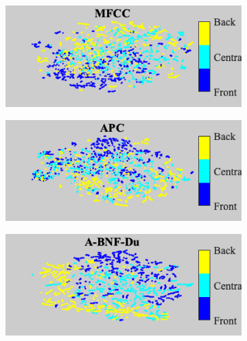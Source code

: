 \documentclass[transmag]{IEEEtran}
\begin{document}
\begin{figure}[!t]
    \begin{subfigure}{0.495\linewidth}
	   \centering
	   \includegraphics[width=1\linewidth]{Rtsne_af_backness_mfcc_disc_bar_adjust_journal.png}
    \end{subfigure}
   \begin{subfigure}{0.495\linewidth}
	   \centering
	   \includegraphics[width=1\linewidth]{Rtsne_af_backness_apc_unlab_600_disc_bar_adjust_journal.png}
    \end{subfigure}
    \newline
   \begin{subfigure}{0.495\linewidth}
	   \centering
	   \includegraphics[width=1\linewidth]{Rtsne_af_backness_bnf_cgn_apc_input_disc_bar_adjust_journal.png}
    \end{subfigure}    \begin{subfigure}{0.495\linewidth}

\end{subfigure}
\end{figure}
\end{document}
